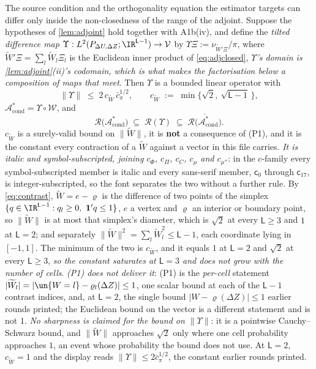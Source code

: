 \begin{corollary}\label{cor:rangegap}
The source condition and the orthogonality equation the estimator targets can differ only inside the
non-closedness of the range of the adjoint.
Suppose the hypotheses of \cref{lem:adjoint} hold together with A1b(iv), and define the
\emph{tilted difference map}
$\Upsilon:L^{2}(P_{\Delta U,\Delta Z};\IR^{\mathsf L-1})\to\mathcal V$ by
$\Upsilon\Xi:=\nu_{\widetilde W'\Xi}/\pi$, where $\widetilde W'\Xi=\sum_{l}\widetilde W_l\Xi_l$ is the
Euclidean inner product of \eqref{eq:adjclosed}, \emph{$\Upsilon$'s domain is
\cref{lem:adjoint}\textup{(ii)}'s codomain, which is what makes the factorisation below a composition of
maps that meet}. Then $\Upsilon$ is a bounded linear operator with
\[
\big\|\Upsilon\big\|\;\le\;2\,c_{\widetilde W}\,\bar c_\pi^{1/2},
\qquad
c_{\widetilde W}\;:=\;\min\big\{\sqrt2,\ \sqrt{\mathsf L-1}\,\big\},
\]
$\mathcal A^\ast_{\mathrm{cond}}=\Upsilon\circ\mathcal W$, and
\begin{equation}\label{eq:rangegap}
\mathcal R\big(\mathcal A^\ast_{\mathrm{cond}}\big)\;\subseteq\;\mathcal R(\Upsilon)\;\subseteq\;
\overline{\mathcal R\big(\mathcal A^\ast_{\mathrm{cond}}\big)} .
\end{equation}
$c_{\widetilde W}$ is a surely-valid bound on $\|\widetilde W\|$, it is
\textbf{not} a consequence of \textup{(P1)}, and it is the constant every contraction of a
$\widetilde W$ against a vector in this file carries. \emph{It is italic and symbol-subscripted,
joining $c_\Phi$, $c_\Pi$, $c_C$, $c_\mu$ and $c_{\mu''}$}: in the $c$-family every symbol-subscripted
member is italic and every sans-serif member, $\mathsf c_0$ through $\mathsf c_{17}$, is
integer-subscripted, so the font separates the two without a further rule.
By \eqref{eq:contrast}, $\widetilde W=e-\varrho$
is the difference of two points of the simplex $\{q\in\IR^{\mathsf L-1}:q_l\ge0,\ \mathbf 1'q\le1\}$, 
$e$ a vertex and $\varrho$ an interior or boundary point, so $\|\widetilde W\|$ is at most that
simplex's diameter, which is $\sqrt2$ at every $\mathsf L\ge3$ and $1$ at $\mathsf L=2$; and separately
$\|\widetilde W\|^{2}=\sum_l\widetilde W_l^{2}\le\mathsf L-1$, each coordinate lying in $[-1,1]$. The
minimum of the two is $c_{\widetilde W}$, and it equals $1$ at $\mathsf L=2$ and $\sqrt2$ at
every $\mathsf L\ge3$, \emph{so the constant saturates at $\mathsf L=3$ and does not grow with the
number of cells}. \emph{\textup{(P1)} does not deliver it}: \textup{(P1)} is the \emph{per-cell}
statement $|\widetilde W_l|=|\un\{W=l\}-\varrho_l(\Delta Z)|\le1$, one scalar bound at each of the
$\mathsf L-1$ contrast indices, and, at $\mathsf L=2$, the single bound $|W-\varrho(\Delta Z)|\le1$
earlier rounds printed; the Euclidean bound on the vector is a different statement and is not $1$.
\emph{No sharpness is claimed for the bound on $\|\Upsilon\|$}: it is a pointwise Cauchy--Schwarz bound,
and $\|\widetilde W\|$ approaches $\sqrt2$ only where one cell probability approaches $1$, an event whose
probability the bound does not use. At $\mathsf L=2$, $c_{\widetilde W}=1$ and the display
reads $\|\Upsilon\|\le2\bar c_\pi^{1/2}$, the constant earlier rounds printed.
\end{corollary}

